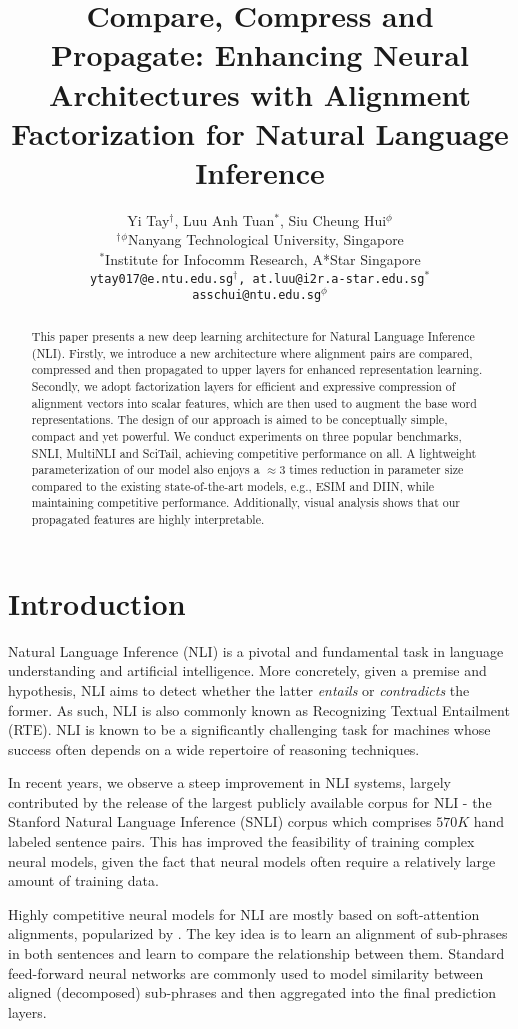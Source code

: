 \documentclass[11pt,a4paper]{article}
\title{Compare, Compress and Propagate: Enhancing Neural Architectures with Alignment Factorization for Natural Language Inference}
\author{Yi Tay$^\dagger$, Luu Anh Tuan$^\ast$, Siu Cheung Hui$^\phi$ \\
  $^\dagger$$^\phi$Nanyang Technological University, Singapore \\
  $^\ast$Institute for Infocomm Research, A*Star Singapore \\
  {\tt ytay017@e.ntu.edu.sg$^\dagger$, at.luu@i2r.a-star.edu.sg$^\ast$} \\
  {\tt asschui@ntu.edu.sg$^\phi$} \\
  }
\date{}
\begin{document}
\maketitle
\begin{abstract}
This paper presents a new deep learning architecture for Natural Language Inference (NLI). Firstly, we introduce a new architecture where alignment pairs are compared, compressed and then propagated to upper layers for enhanced representation learning. Secondly, we adopt factorization layers for efficient and expressive compression of alignment vectors into scalar features, which are then used to augment the base word representations. The design of our approach is aimed to be conceptually simple, compact and yet powerful. We conduct experiments on three popular benchmarks, SNLI, MultiNLI and SciTail, achieving competitive performance on all. A lightweight parameterization of our model also enjoys a $\approx 3$ times reduction in parameter size compared to the existing state-of-the-art models, e.g., ESIM and DIIN, while maintaining competitive performance. Additionally, visual analysis shows that our propagated features are highly interpretable.
 \end{abstract}

 \section{Introduction}
Natural Language Inference (NLI) is a pivotal and fundamental task in language understanding and artificial intelligence. More concretely, given a premise and hypothesis, NLI aims to detect whether the latter \textit{entails} or \textit{contradicts} the former. As such, NLI is also commonly known as Recognizing Textual Entailment (RTE). NLI is known to be a significantly challenging task for machines whose success often depends on a wide repertoire of reasoning techniques.

In recent years, we observe a steep improvement in NLI systems, largely contributed by the release of the largest publicly available corpus for NLI - the Stanford Natural Language Inference (SNLI) corpus \cite{DBLP:conf/emnlp/BowmanAPM15} which comprises $570K$ hand labeled sentence pairs. This has improved the feasibility of training complex neural models, given the fact that neural models often require a relatively large amount of training data.

Highly competitive neural models for NLI are mostly based on soft-attention alignments, popularized by \cite{DBLP:conf/emnlp/ParikhT0U16,rocktaschel2015reasoning}. The key idea is to learn an alignment of sub-phrases in both sentences and learn to compare the relationship between them. Standard feed-forward neural networks are commonly used to model similarity between aligned (decomposed) sub-phrases and then aggregated into the final prediction layers.
\end{document}
